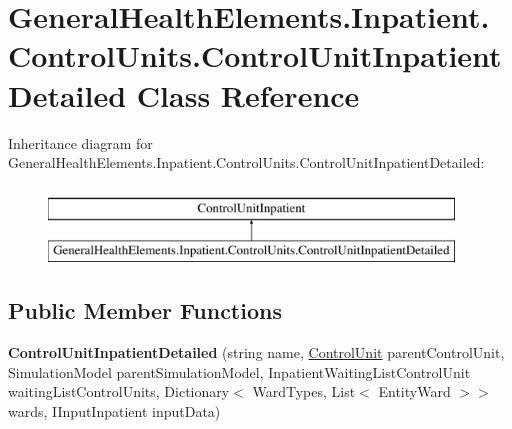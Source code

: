 \hypertarget{class_general_health_elements_1_1_inpatient_1_1_control_units_1_1_control_unit_inpatient_detailed}{}\section{General\+Health\+Elements.\+Inpatient.\+Control\+Units.\+Control\+Unit\+Inpatient\+Detailed Class Reference}
\label{class_general_health_elements_1_1_inpatient_1_1_control_units_1_1_control_unit_inpatient_detailed}
Inheritance diagram for General\+Health\+Elements.\+Inpatient.\+Control\+Units.\+Control\+Unit\+Inpatient\+Detailed\+:\begin{figure}[H]
\begin{center}
\leavevmode
\includegraphics[height=2.000000cm]{class_general_health_elements_1_1_inpatient_1_1_control_units_1_1_control_unit_inpatient_detailed}
\end{center}
\end{figure}
\subsection*{Public Member Functions}
\begin{DoxyCompactItemize}
\item 
{\bfseries Control\+Unit\+Inpatient\+Detailed} (string name, \hyperlink{class_simulation_core_1_1_h_c_c_m_elements_1_1_control_unit}{Control\+Unit} parent\+Control\+Unit, Simulation\+Model parent\+Simulation\+Model, Inpatient\+Waiting\+List\+Control\+Unit waiting\+List\+Control\+Units, Dictionary$<$ Ward\+Types, List$<$ Entity\+Ward $>$$>$ wards, I\+Input\+Inpatient input\+Data)\hypertarget{class_general_health_elements_1_1_inpatient_1_1_control_units_1_1_control_unit_inpatient_detailed_af0eaf523e644939cff421109002bafbb}{}\label{class_general_health_elements_1_1_inpatient_1_1_control_units_1_1_control_unit_inpatient_detailed_af0eaf523e644939cff421109002bafbb}

\end{DoxyCompactItemize}
